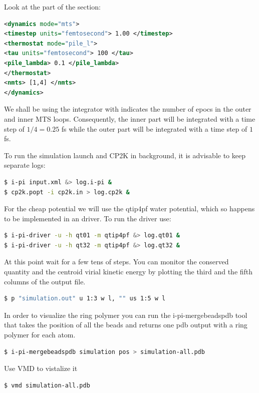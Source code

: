 \documentclass{article}
\begin{document}
\begin{Exercise}[label={water},title={Multiple time steps with an \emph{ab initio} potential}]
\Question
Look at  the  part of the  section:
\begin{lstlisting}[language=xml]
<dynamics mode="mts">
<timestep units="femtosecond"> 1.00 </timestep>
<thermostat mode="pile_l">
<tau units="femtosecond"> 100 </tau>
<pile_lambda> 0.1 </pile_lambda>
</thermostat>
<nmts> [1,4] </nmts>
</dynamics>
\end{lstlisting}
We shall be using the  integrator with  indicates the number of epocs in the outer and inner MTS loops. Consequently, the inner part will be integrated with a time step of $1/4 = 0.25$ fs  while the outer part will be integrated with a time step of $1$ fs.

\Question
To run the simulation launch \ipi{} and CP2K in background, it is advisable to keep  separate logs:
\begin{lstlisting}[language=bash]
$ i-pi input.xml &> log.i-pi &
$ cp2k.popt -i cp2k.in > log.cp2k & 
\end{lstlisting}
For the cheap potential we will use the qtip4pf water potential, which so happens to be implemented in an \ipi{} driver. To run the driver use:
\begin{lstlisting}[language=bash]
$ i-pi-driver -u -h qt01 -m qtip4pf &> log.qt01 &
$ i-pi-driver -u -h qt32 -m qtip4pf &> log.qt32 &
\end{lstlisting}
At this point wait for a few tens of steps. You can monitor the conserved quantity and the centroid virial kinetic energy by plotting the third  and the fifth columns of the output file.
\begin{lstlisting}[language=bash]
$ p "simulation.out" u 1:3 w l, "" us 1:5 w l
\end{lstlisting}
\Question
In order to visualize the ring polymer you can run the i-pi-mergebeadspdb tool that takes the position of all the beads and returns one pdb output with a ring polymer for each atom.
\begin{lstlisting}[language=bash]
$ i-pi-mergebeadspdb simulation pos > simulation-all.pdb 
\end{lstlisting}
Use VMD to vistalize it
\begin{lstlisting}[language=bash]
$ vmd simulation-all.pdb
\end{lstlisting}
\end{Exercise}
\end{document}

